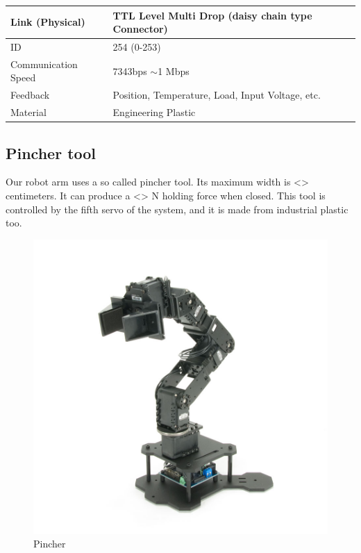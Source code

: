 \begin{table}[ht]
\begin{tabular}{|l|l|}
					Link (Physical)      & TTL Level Multi Drop (daisy chain type Connector)                                                              \\ \hline
					ID                   & 254 (0-253)                                                                                                    \\ \hline
					Communication Speed  & 7343bps $\sim$1 Mbps                                                                                           \\ \hline
					Feedback						 & Position, Temperature, Load, Input Voltage, etc.																																\\ \hline
					Material						 & Engineering Plastic																																														\\ \hline
				\end{tabular}
			\end{table}

		\subsection{Pincher tool}
	
			\hspace{15pt}Our robot arm uses a so called pincher tool. Its maximum width is <> centimeters. It can produce a <> N holding force when closed. This tool is controlled by the fifth servo of the system, and it is made from industrial plastic too. \cite{robot_servo} \cite{pincher}
		
				\begin{figure}[H]
					\centering
					\includegraphics[scale=0.33]{./images/pincher}
					\caption{Pincher\cite{pincher}}
				\end{figure}
	
